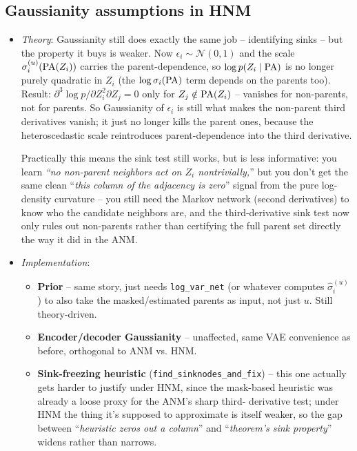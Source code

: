 \subsection{Gaussianity assumptions in HNM}
\begin{itemize}
\item \textit{Theory}: Gaussianity still does exactly the same job -- identifying sinks -- but the 
property it buys is weaker. Now $\epsilon_i\sim\mathcal N(0,1)$ and the scale $\sigma_i^{(u)}(\mathrm{PA}(Z_i))$ 
carries the parent-dependence, so $\log p(Z_i\mid\mathrm{PA})$ is no longer purely quadratic in $Z_i$ 
(the $\log\sigma_i(\mathrm{PA})$ term depends on the parents too). Result: $\partial^3\log p/\partial 
Z_i^2\partial Z_j=0$ only for $Z_j\notin\mathrm{PA}(Z_i)$ -- vanishes for non-parents, not for parents. So 
Gaussianity of $\epsilon_i$ is still what makes the non-parent third derivatives vanish; it just no 
longer kills the parent ones, because the heteroscedastic scale reintroduces parent-dependence into the 
third derivative.

Practically this means the sink test still works, but is less informative: you learn 
\textit{``no non-parent neighbors act on $Z_i$ nontrivially,}'' but you don't get the same clean 
``\textit{this column of the adjacency is zero}'' signal from the pure log-density curvature -- you 
still need the Markov network (second derivatives) to know who the candidate neighbors are, and the 
third-derivative sink test now only rules out non-parents rather than certifying the full parent set 
directly the way it did in the ANM.
\newpage
\item \textit{Implementation}:
\begin{itemize}
\item \textbf{Prior} -- same story, just needs \texttt{log\_var\_net} (or whatever computes 
$\hat\sigma_i^{(u)}$) to also take the masked/estimated parents as input, not just $u$. Still 
{theory-driven}.
\item \textbf{Encoder/decoder Gaussianity} -- unaffected, same VAE convenience as before, orthogonal to 
ANM vs. HNM.
\item \textbf{Sink-freezing heuristic} (\texttt{find\_sinknodes\_and\_fix}) -- 
this one actually gets harder to 
justify under HNM, since the mask-based heuristic was already a loose proxy for the ANM's sharp third-
derivative test; under HNM the thing it's supposed to approximate is itself weaker, so the gap between 
``\textit{heuristic zeros out a column}'' and ``\textit{theorem's sink property}'' widens rather than 
narrows.
\end{itemize}
\end{itemize}